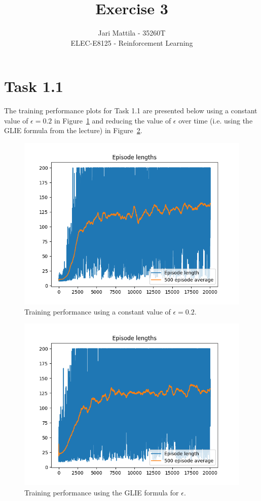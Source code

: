 \documentclass[12pt]{article}
\begin{document}
 
\title{Exercise 3}
\author{
Jari Mattila - 35260T\\
ELEC-E8125 - Reinforcement Learning}

\maketitle
\section*{Task 1.1}

The training performance plots for Task 1.1 are presented below using a constant value of $\epsilon = 0.2$ in Figure~\ref*{fig:fig1} and reducing the value of $\epsilon$ over time (i.e. using the GLIE formula from the lecture) in Figure~\ref*{fig:fig2}.
\newline

\begin{figure}[h] 
	\centering  %
    \includegraphics[width=0.9\columnwidth]{img/Figure_1_task1_1_eps-fixed_episode_reward.png}
	\caption{Training performance using a constant value of $\epsilon = 0.2$.}
	\label{fig:fig1}
\end{figure}

\begin{figure}[h] 
	\centering  %
    \includegraphics[width=0.9\columnwidth]{img/Figure_1_task1_1_eps-GLIE_episode_reward.png}
	\caption{Training performance using the GLIE formula for $\epsilon$.}
	\label{fig:fig2}
\end{figure}
\end{document}
